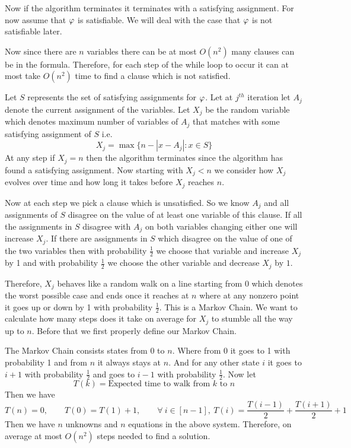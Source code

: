 Now if the algorithm terminates it terminates with a satisfying assignment. For now assume that $\varphi$ is satisfiable. We will deal with the case that $\varphi$ is not satisfiable later. 

Now since there are $n$ variables there can be at most $O(n^2)$ many clauses can be in the formula. Therefore, for each step of the while loop to occur it can at most take $O(n^2)$ time to find a clause which is not satisfied.

Let $S$ represents the set of satisfying assignments for $\varphi$. Let at $j^{th}$ iteration let $A_j$ denote the current assignment of the variables. Let $X_j$ be the random variable which denotes maximum number of variables of $A_j$ that matches with some satisfying assignment of $S$ i.e. $$X_j=\max\{n-|x-A_j|\colon x\in S\}$$At any step if $X_j=n$ then the algorithm terminates since the algorithm has found a satisfying assignment. Now starting with $X_j<n$ we consider how $X_j$ evolves over time and how long it takes before $X_j$ reaches $n$.

Now at each step we pick a clause which is unsatisfied. So we know $A_j$ and all assignments of $S$ disagree on the value of at least one variable of this clause. If all the assignments in $S$ disagree with $A_j$ on both variables changing either one will increase $X_j$. If there are assignments in $S$ which disagree on the value of one of the two variables then with probability $\frac12$ we choose that variable and increase $X_j$ by 1 and with probability $\frac12$ we choose the other variable and decrease $X_j$ by $1$.

Therefore, $X_j$ behaves like a random walk on a line starting from $0$ which denotes the worst possible case and ends once it reaches at $n$ where at any nonzero point it goes up or down by 1 with probability $\frac12$. This is a Markov Chain. We want to calculate how many steps does it take on average for $X_j$ to stumble all the way up to $n$. Before that we first properly define our Markov Chain.

The Markov Chain consists states from $0 $ to $n$. Where from 0 it goes to 1 with probability 1 and from $n$ it always stays at $n$. And for any other state $i$ it goes to $i+1$ with probability $\frac12$ and goes to $i-1$ with probability $\frac12$. Now let $$T(k)=\text{Expected time to walk from $k$ to $n$}$$ Then we have $$T(n)=0,\qquad T(0)=T(1)+1, \qquad\forall\ i\in [n-1],\ T(i)=\frac{T(i-1)}{2}+\frac{T(i+1)}2+1$$Then we have $n$ unknowns and $n$ equations in the above system. Therefore, on average at most $O(n^2)$ steps needed to find a solution.

